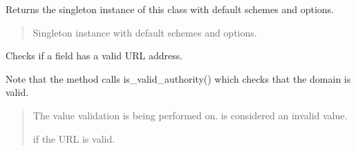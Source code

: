 \documentclass[letterpaper,10pt,english]{sphinxmanual}
\begin{document}
\begin{fulllineitems}

\begin{fulllineitems}
\label{\detokenize{apache_commons_validator_python.routines:apache_commons_validator_python.routines.url_validator.UrlValidator.get_instance}}
\pysigstartsignatures
{}
\pysigstopsignatures
\sphinxAtStartPar
Returns the singleton instance of this class with default schemes and
options.
\begin{quote}\begin{description}
\sphinxAtStartPar
Singleton instance with default schemes and options.

\end{description}\end{quote}

\end{fulllineitems}


\begin{fulllineitems}
\label{\detokenize{apache_commons_validator_python.routines:apache_commons_validator_python.routines.url_validator.UrlValidator.is_valid}}
\pysigstartsignatures
{}
\pysigstopsignatures
\sphinxAtStartPar
Checks if a field has a valid URL address.

\sphinxAtStartPar
Note that the method calls is\_valid\_authority() which checks that the domain is
valid.
\begin{quote}\begin{description}
\sphinxAtStartPar
{} \textendash{} The value validation is being performed on.  is considered an
invalid value.

\sphinxAtStartPar
{} if the URL is valid.


\end{description}
\end{quote}
\end{fulllineitems}
\end{fulllineitems}
\end{document}
